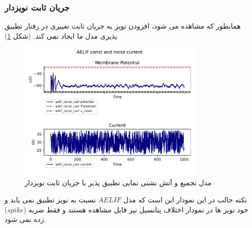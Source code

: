 \documentclass{article}
\begin{document}
            \subsubsection{جریان ثابت نویزدار} 
                همانطور که مشاهده می شود، افزودن نویز به جریان ثابت تغییری در رفتار تطبیق پذیری مدل ما ایجاد نمی کند.                
                (شکل \ref{fig:aelif-const-noise-curr})   
                \begin{figure}[H]
                    \centering
                    \includegraphics[width=0.8\textwidth]{plots/AELIF const and noise current.pdf} 
                    \caption{مدل تجمیع و آتش نشتی نمایی تطبیق پذیر با جریان ثابت نویزدار  }
                    \label{fig:aelif-const-noise-curr}
                \end{figure}
                نکته جالب در این نمودار این است که مدل 
                $AELIF$ 
                نسبت به نویز تطبیق نمی یابد و خود نویز ها در نمودار اختلاف پتانسیل نیز قابل مشاهده هستند و فقط ضربه
                ($spike$) 
                زده نمی شود.
\end{document}
